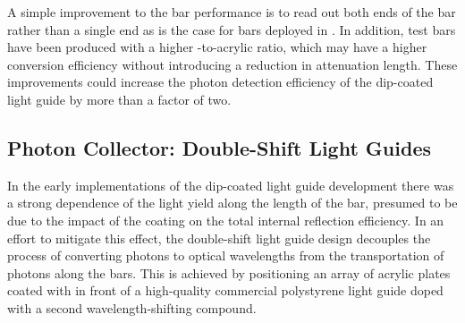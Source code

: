 

 A simple improvement to the bar performance is to read out both ends of the bar rather than a single end as is the case for bars deployed in .  
In addition, test bars have been produced with a higher -to-acrylic ratio, which may have a higher conversion efficiency without introducing a reduction in attenuation length. These improvements could increase the photon detection efficiency of the dip-coated light guide by more than a factor of two.

\subsection{Photon Collector: Double-Shift Light Guides}
\label{ssec:fdsp-pd-pc-bar2}

In the early implementations of the dip-coated light guide development there was a strong dependence of the light yield along the length of the bar, presumed to be due to the impact of the coating on the total internal reflection efficiency.  In an effort to mitigate this effect, the double-shift light guide design decouples the process of converting  photons to optical
wavelengths from the transportation of photons along the bars. This is achieved by positioning an array of acrylic plates coated with  in front of a high-quality commercial polystyrene light guide doped with a second wavelength-shifting compound.


